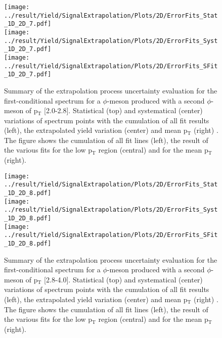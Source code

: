 \begin{figure}
\centering
\texttt{[image: ../result/Yield/SignalExtrapolation/Plots/2D/ErrorFits\_Stat\_1D\_2D\_7.pdf]}\\
\texttt{[image: ../result/Yield/SignalExtrapolation/Plots/2D/ErrorFits\_Syst\_1D\_2D\_7.pdf]}\\
\texttt{[image: ../result/Yield/SignalExtrapolation/Plots/2D/ErrorFits\_SFit\_1D\_2D\_7.pdf]}
\label{fig:Extrap2D_7}
\caption{Summary of the extrapolation process uncertainty evaluation for the first-conditional spectrum for a $\phi$-meson produced with a second $\phi$-meson of p$_{\text{T}}$ [2.0-2.8]. Statistical (top) and systematical (center) variations of spectrum points with the cumulation of all fit results (left), the extrapolated yield variation (center) and mean p$_{\text{T}}$ (right) . The figure shows the cumulation of all fit lines (left), the result of the various fits for the low p$_{\text{T}}$ region (central) and for the mean p$_{\text{T}}$ (right).}
\end{figure}

\begin{figure}
\centering
\texttt{[image: ../result/Yield/SignalExtrapolation/Plots/2D/ErrorFits\_Stat\_1D\_2D\_8.pdf]}\\
\texttt{[image: ../result/Yield/SignalExtrapolation/Plots/2D/ErrorFits\_Syst\_1D\_2D\_8.pdf]}\\
\texttt{[image: ../result/Yield/SignalExtrapolation/Plots/2D/ErrorFits\_SFit\_1D\_2D\_8.pdf]}
\label{fig:Extrap2D_8}
\caption{Summary of the extrapolation process uncertainty evaluation for the first-conditional spectrum for a $\phi$-meson produced with a second $\phi$-meson of p$_{\text{T}}$ [2.8-4.0]. Statistical (top) and systematical (center) variations of spectrum points with the cumulation of all fit results (left), the extrapolated yield variation (center) and mean p$_{\text{T}}$ (right) . The figure shows the cumulation of all fit lines (left), the result of the various fits for the low p$_{\text{T}}$ region (central) and for the mean p$_{\text{T}}$ (right).}
\end{figure}

